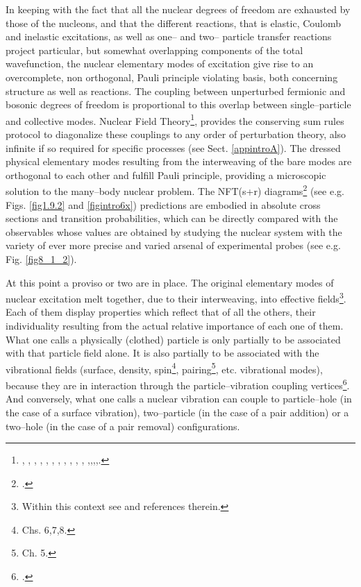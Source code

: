 In keeping with the fact that all the nuclear degrees of freedom are exhausted by those of the nucleons, and that the different reactions, that is elastic, Coulomb and inelastic excitations, as well as  one-- and two-- particle transfer reactions project particular, but somewhat
 overlapping  components of the total wavefunction, the nuclear elementary modes of excitation give  rise to an overcomplete, non orthogonal, Pauli principle violating basis, both concerning structure as well as reactions. The coupling between unperturbed fermionic and bosonic degrees of freedom is proportional to this overlap between single--particle and collective modes. Nuclear Field Theory\footnote{\cite{Bes:74}, \cite{Bes:76a}, \cite{Bes:76b}, \cite{Bes:76c}, \cite{Bes:75}, \cite{Broglia:76}, \cite{Bes:75b}, \cite{Mottelson:76}, \cite{Bes:77}, \cite{Bortignon:77}, \cite{Bortignon:78}, \cite{Broglia:04a},\cite{Reinhardt:75},\cite{Reinhardt:78a},\cite{Reinhardt:78b},\cite{Reinhardt:80}.}, provides the conserving sum rules protocol to diagonalize these couplings  to any order of perturbation theory, also infinite if so required for specific processes (see Sect. \ref{appintroA}). The dressed physical elementary modes resulting from the interweaving of the bare modes are orthogonal to each other and fulfill Pauli principle, providing a microscopic solution to the many--body nuclear problem. 
 The NFT(s+r) diagrams\footnote{\cite{Broglia:75,Broglia:04a,Broglia:16}.} (see e.g. Figs. \ref{fig1.9.2} and  \ref{figintro6x}) predictions are embodied in absolute cross sections and transition probabilities, which can be directly compared with the observables whose values are obtained by studying the nuclear system with  the variety of ever more precise and varied arsenal of experimental probes (see e.g. Fig. \ref{fig8_1_2}). 

At this point a proviso or two are in place. The original elementary modes of nuclear excitation melt together, due to their interweaving, into effective fields\footnote{Within this context see \cite{Dickhoff:05} and references therein.}. Each of them display properties which reflect that of all the others, their individuality resulting from the actual relative importance of each one of them. What one calls a physically  (clothed) particle is only partially to be associated with that particle field alone. It is also partially to be associated with the  vibrational fields
 (surface, density, spin\footnote{\cite{Bertsch:05} Chs. 6,7,8.}, pairing\footnote{\cite{Brink:05} Ch. 5.}, etc. vibrational modes), 
 because they are in interaction through the particle--vibration coupling vertices\footnote{\cite{Bohr:75}.}. And conversely, what one calls a nuclear vibration can couple to  particle--hole (in the case of a surface vibration),  two--particle (in the case of a pair addition) or a two--hole (in the case of a pair removal)  configurations. 
 
